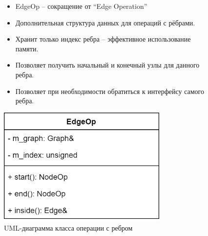 \begin{frame}
	\begin{figure}
		\begin{minipage}{0.49\textwidth}
			\begin{itemize}
				\item EdgeOp -- сокращение от ``Edge Operation''
				\item Дополнительная структура данных для операций с рёбрами.
				\item Хранит только индекс ребра -- эффективное использование памяти.
				\item Позволяет получить начальный и конечный узлы для данного ребра.
				\item Позволяет при необходимости обратиться к интерфейсу самого ребра.
			\end{itemize}
		\end{minipage}\hfill\begin{minipage}{0.49\textwidth}
			\centering
			\includegraphics[width=0.75\textwidth]{images/class.edgeop.png}
			\caption{UML-диаграмма класса операции с ребром}
		\end{minipage}
	\end{figure}
\end{frame}
